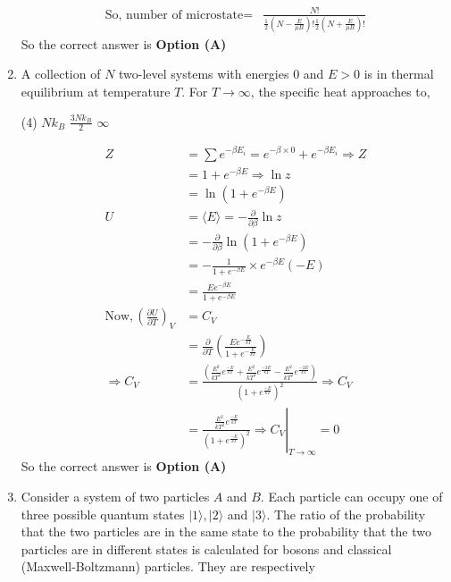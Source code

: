 \begin{enumerate}
\begin{answer}
\begin{align*}
\text{So, number of microstate}=&\frac{N !}{\frac{1}{2}\left(N-\frac{E}{\mu B}\right) ! \frac{1}{2}\left(N+\frac{E}{\mu B}\right) !}
\end{align*}
So the correct answer is \textbf{Option (A)}
\end{answer}
	\item A collection of $N$ two-level systems with energies 0 and $E>0$ is in thermal
	equilibrium at temperature $T$. For $T \rightarrow \infty$, the specific heat approaches to,
\begin{tasks}(4)
\task[\textbf{B.}] $N k_{B}$
\task[\textbf{C.}] $\frac{3 N k_{B}}{2}$
\task[\textbf{D.}] $\infty$
\end{tasks}
\begin{answer}
\begin{align*}
Z&=\sum e^{-\beta E_{i}}=e^{-\beta \times 0}+e^{-\beta E_{i}} \Rightarrow Z\\&=1+e^{-\beta E} \Rightarrow \ln z\\&=\ln \left(1+e^{-\beta E}\right)\\
U&=\langle E\rangle=-\frac{\partial}{\partial \beta} \ln z\\&=-\frac{\partial}{\partial \beta} \ln \left(1+e^{-\beta E}\right)\\&=-\frac{1}{1+e^{-\beta E}} \times e^{-\beta E}(-E)\\&=\frac{E e^{-\beta E}}{1+e^{-\beta E}}\\
\text{Now},\left(\frac{\partial U}{\partial T}\right)_{V}&=C_{V}\\
&=\frac{\partial}{\partial T}\left(\frac{E e^{-\frac{E}{k T}}}{1+e^{-\frac{E}{k T}}}\right)\\
\Rightarrow C_{V}&=\frac{\left(\frac{E^{2}}{k T^{2}} e^{\frac{-E}{k T}}+\frac{E^{2}}{k T^{2}} e^{\frac{-2 E}{k T}}-\frac{E^{2}}{k T^{2}} e^{\frac{-2 E}{k T}}\right)}{\left(1+e^{\frac{-E}{k T}}\right)^{2}} \Rightarrow C_{V}\\
&=\left.\frac{\frac{E^{2}}{k T^{2}} e^{\frac{-E}{k T}}}{\left(1+e^{\frac{-E}{k T}}\right)^{2}} \Rightarrow C_{V}\right|_{T \rightarrow \infty}=0
\end{align*}
So the correct answer is \textbf{Option (A)}
\end{answer}
\item 	Consider a system of two particles $A$ and $B$. Each particle can occupy one of three possible quantum states $|1\rangle,|2\rangle$ and $|3\rangle$. The ratio of the probability that the two particles
are in the same state to the probability that the two particles are in different states is calculated for bosons and classical (Maxwell-Boltzmann) particles. They are respectively

\end{enumerate}

